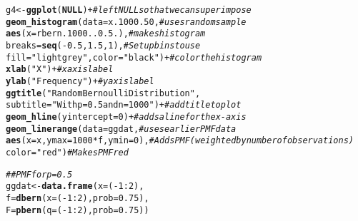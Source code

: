 \documentclass{article}\usepackage[]{graphicx}\usepackage[]{color}
\makeatletter
\newcommand{\hlnum}[1]{\textcolor[rgb]{0.686,0.059,0.569}{#1}}%
\newcommand{\hlstr}[1]{\textcolor[rgb]{0.192,0.494,0.8}{#1}}%
\newcommand{\hlcom}[1]{\textcolor[rgb]{0.678,0.584,0.686}{\textit{#1}}}%
\newcommand{\hlopt}[1]{\textcolor[rgb]{0,0,0}{#1}}%
\newcommand{\hlstd}[1]{\textcolor[rgb]{0.345,0.345,0.345}{#1}}%
\newcommand{\hlkwa}[1]{\textcolor[rgb]{0.161,0.373,0.58}{\textbf{#1}}}%
\newcommand{\hlkwb}[1]{\textcolor[rgb]{0.69,0.353,0.396}{#1}}%
\newcommand{\hlkwc}[1]{\textcolor[rgb]{0.333,0.667,0.333}{#1}}%
\newcommand{\hlkwd}[1]{\textcolor[rgb]{0.737,0.353,0.396}{\textbf{#1}}}%
\newenvironment{kframe}{%
 \def\at@end@of@kframe{}%
 \ifinner\ifhmode%
  \def\at@end@of@kframe{\end{minipage}}%
  \begin{minipage}{\columnwidth}%
 \fi\fi%
 \def\FrameCommand##1{\hskip\@totalleftmargin \hskip-\fboxsep
 \colorbox{shadecolor}{##1}\hskip-\fboxsep
     \hskip-\linewidth \hskip-\@totalleftmargin \hskip\columnwidth}%
 \MakeFramed {\advance\hsize-\width
   \@totalleftmargin\z@ \linewidth\hsize
   \@setminipage}}%
 {\par\unskip\endMakeFramed%
 \at@end@of@kframe}
\newenvironment{knitrout}{}{} %
\makeatother
\begin{document}
\begin{enumerate}
\begin{knitrout}
\begin{kframe}
\begin{alltt}
\hlstd{g4}\hlkwb{<-}\hlkwd{ggplot}\hlstd{(}\hlkwa{NULL}\hlstd{)} \hlopt{+}                                      \hlcom{#left NULL so that we can superimpose}
  \hlkwd{geom_histogram}\hlstd{(}\hlkwc{data}\hlstd{=x.1000.50,}                        \hlcom{#uses random sample}
                 \hlkwd{aes}\hlstd{(}\hlkwc{x}\hlstd{=rbern.1000..0.5.),}               \hlcom{#makes histogram}
                 \hlkwc{breaks}\hlstd{=}\hlkwd{seq}\hlstd{(}\hlopt{-}\hlnum{0.5}\hlstd{,}\hlnum{1.5}\hlstd{,}\hlnum{1}\hlstd{),}                \hlcom{#Set up bins to use}
                 \hlkwc{fill} \hlstd{=} \hlstr{"lightgrey"}\hlstd{,} \hlkwc{color}\hlstd{=}\hlstr{"black"}\hlstd{)} \hlopt{+}   \hlcom{#color the histogram}
  \hlkwd{xlab}\hlstd{(}\hlstr{"X"}\hlstd{)} \hlopt{+}                                           \hlcom{#x axis label}
  \hlkwd{ylab}\hlstd{(}\hlstr{"Frequency"}\hlstd{)}\hlopt{+}                                    \hlcom{#y axis label}
  \hlkwd{ggtitle}\hlstd{(}\hlstr{"Random Bernoulli Distribution"}\hlstd{,}
          \hlkwc{subtitle} \hlstd{=} \hlstr{"With p=0.5 and n=1000"}\hlstd{)} \hlopt{+}         \hlcom{#add title to plot}
  \hlkwd{geom_hline}\hlstd{(}\hlkwc{yintercept}\hlstd{=}\hlnum{0}\hlstd{)} \hlopt{+}                            \hlcom{#adds a line for the x-axis}
  \hlkwd{geom_linerange}\hlstd{(}\hlkwc{data}\hlstd{=ggdat,}                            \hlcom{#uses earlier PMF data}
                 \hlkwd{aes}\hlstd{(}\hlkwc{x}\hlstd{=x,} \hlkwc{ymax}\hlstd{=}\hlnum{1000}\hlopt{*}\hlstd{f,} \hlkwc{ymin}\hlstd{=}\hlnum{0}\hlstd{),}         \hlcom{#Adds PMF (weighted by number of observations)}
                 \hlkwc{color}\hlstd{=}\hlstr{"red"}\hlstd{)}                           \hlcom{#Makes PMF red}

\hlcom{## PMF for p=0.5 }
\hlstd{ggdat} \hlkwb{<-} \hlkwd{data.frame}\hlstd{(}\hlkwc{x} \hlstd{= (}\hlopt{-}\hlnum{1}\hlopt{:}\hlnum{2}\hlstd{),}
                      \hlkwc{f} \hlstd{=} \hlkwd{dbern}\hlstd{(}\hlkwc{x} \hlstd{= (}\hlopt{-}\hlnum{1}\hlopt{:}\hlnum{2}\hlstd{),} \hlkwc{prob} \hlstd{=} \hlnum{0.75}\hlstd{),}
                      \hlkwc{F} \hlstd{=} \hlkwd{pbern}\hlstd{(}\hlkwc{q} \hlstd{= (}\hlopt{-}\hlnum{1}\hlopt{:}\hlnum{2}\hlstd{),} \hlkwc{prob} \hlstd{=} \hlnum{0.75}\hlstd{))}


\end{alltt}
\end{kframe}
\end{knitrout}
\end{enumerate}
\end{document}
